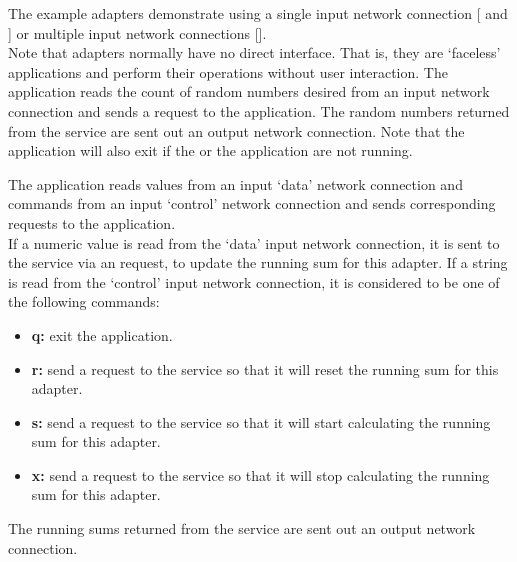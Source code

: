 The example adapters demonstrate using a single input \yarp{} network connection
[ and
] or multiple input \yarp{} network
connections [].\\

Note that adapters normally have no direct interface.
That is, they are `faceless' applications and perform their operations without user
interaction.
The  application reads the count of
random numbers desired from an input \yarp{} network connection and sends a
 request to the
 application.
The random numbers returned from the service are sent out an output \yarp{} network
connection.
Note that the application will also exit if the
 or the
 application are not running.

The  application reads  values from an input
`data' \yarp{} network connection and commands from an input `control' \yarp{} network
connection and sends corresponding requests to the
 application.\\

If a numeric value is read from the `data' input \yarp{} network connection, it is sent to
the service via an  request, to update the
running sum for this adapter.
If a string is read from the `control' input \yarp{} network connection, it is considered
to be one of the following commands:
\begin{itemize}
\item \textbf{q:} exit the application.
\item \textbf{r:} send a  request to the
service so that it will reset the running sum for this adapter.
\item \textbf{s:} send a  request to the
service so that it will start calculating the running sum for this adapter.
\item \textbf{x:} send a  request to the
service so that it will stop calculating the running sum for this adapter.
\end{itemize}
The running sums returned from the service are sent out an output \yarp{} network
connection.\\

